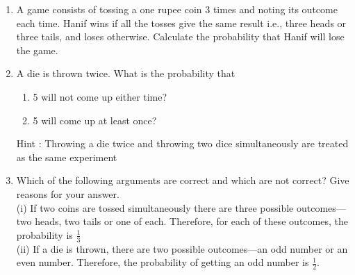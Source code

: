 \begin{enumerate}[label=\arabic*.,ref=\thesubsection.\theenumi]
\begin{enumerate}
\end{enumerate}
%
\begin{table}[ht!]
\centering

\caption{Input Values}
\label{table:1.2.133}	
\end{table}
\solution

\item A game consists of tossing a one rupee coin 3 times and noting its outcome each time. Hanif wins if all the tosses give the same result i.e., three heads or three tails, and loses otherwise. Calculate the probability that Hanif will lose the game.
\\
\solution

\item A die is thrown twice. What is the probability that\\
\begin{enumerate}[label=(\roman*)]
\item  5 will not come up either time? \\
\item  5 will come up at least once?\\
\end{enumerate}
Hint : Throwing a die twice and throwing two dice simultaneously are treated as the
same experiment
\\
\solution

\item Which of the following arguments are correct and which are not correct? Give reasons
for your answer.\\
(i) If two coins are tossed simultaneously there are three possible outcomes—two
heads, two tails or one of each. Therefore, for each of these outcomes, the
probability is $\frac{1}{3}$ \\
(ii) If a die is thrown, there are two possible outcomes—an odd number or an even
number. Therefore, the probability of getting an odd number is $\frac{1}{2}$.
\\

\end{enumerate}
